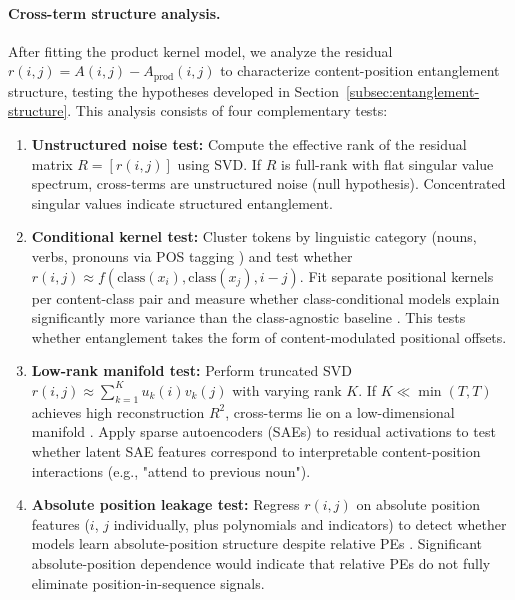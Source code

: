 \documentclass[11pt]{article}
\theoremstyle{definition}
\begin{document}
\paragraph{Cross-term structure analysis.}
After fitting the product kernel model, we analyze the residual $r(i,j) = A(i,j) - A_{\text{prod}}(i,j)$ to characterize content-position entanglement structure, testing the hypotheses developed in Section~\ref{subsec:entanglement-structure}. This analysis consists of four complementary tests:

\begin{enumerate}
    \item \textbf{Unstructured noise test:} Compute the effective rank of the residual matrix $R = [r(i,j)]$ using SVD. If $R$ is full-rank with flat singular value spectrum, cross-terms are unstructured noise (null hypothesis). Concentrated singular values indicate structured entanglement.

    \item \textbf{Conditional kernel test:} Cluster tokens by linguistic category (nouns, verbs, pronouns via POS tagging \cite{manning2014stanford}) and test whether $r(i,j) \approx f(\text{class}(x_i), \text{class}(x_j), i-j)$. Fit separate positional kernels per content-class pair and measure whether class-conditional models explain significantly more variance than the class-agnostic baseline \cite{voita2019headpruning}. This tests whether entanglement takes the form of content-modulated positional offsets.

    \item \textbf{Low-rank manifold test:} Perform truncated SVD $r(i,j) \approx \sum_{k=1}^K u_k(i) v_k(j)$ with varying rank $K$. If $K \ll \min(T, T)$ achieves high reconstruction $R^2$, cross-terms lie on a low-dimensional manifold \cite{park2024geometry}. Apply sparse autoencoders (SAEs) \cite{bricken2023monosemanticity,templeton2024sae} to residual activations to test whether latent SAE features correspond to interpretable content-position interactions (e.g., "attend to previous noun").

    \item \textbf{Absolute position leakage test:} Regress $r(i,j)$ on absolute position features ($i$, $j$ individually, plus polynomials and indicators) to detect whether models learn absolute-position structure despite relative PEs \cite{haviv2022nopos,kazemnejad2024lengthgen}. Significant absolute-position dependence would indicate that relative PEs do not fully eliminate position-in-sequence signals.
\end{enumerate}
\end{document}
